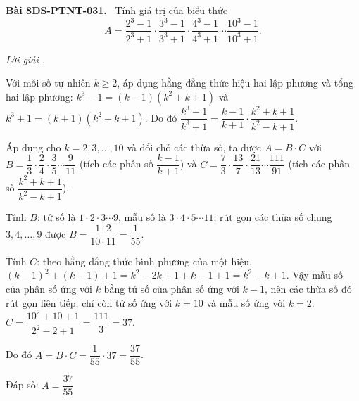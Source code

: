 \documentclass[12pt,a4paper]{article}
\newenvironment{problem}[1][]{\par\medskip\noindent\textbf{Bài #1.}\ }{\par}
\newenvironment{solution}[1][]{\par\noindent\textit{Lời giải #1.}\par}{\par}
\begin{document}
\begin{problem}[8DS-PTNT-031]
Tính giá trị của biểu thức
\[ A = \dfrac{2^3 - 1}{2^3 + 1} \cdot \dfrac{3^3 - 1}{3^3 + 1} \cdot \dfrac{4^3 - 1}{4^3 + 1} \cdots \dfrac{10^3 - 1}{10^3 + 1}. \]

\begin{solution}
Với mỗi số tự nhiên $k \geq 2$, áp dụng hằng đẳng thức hiệu hai lập phương và tổng hai lập phương: $k^3 - 1 = (k - 1)(k^2 + k + 1)$ và $k^3 + 1 = (k + 1)(k^2 - k + 1)$. Do đó $\dfrac{k^3 - 1}{k^3 + 1} = \dfrac{k - 1}{k + 1} \cdot \dfrac{k^2 + k + 1}{k^2 - k + 1}$.

Áp dụng cho $k = 2, 3, \ldots, 10$ và đổi chỗ các thừa số, ta được $A = B \cdot C$ với $B = \dfrac{1}{3} \cdot \dfrac{2}{4} \cdot \dfrac{3}{5} \cdots \dfrac{9}{11}$ (tích các phân số $\dfrac{k - 1}{k + 1}$) và $C = \dfrac{7}{3} \cdot \dfrac{13}{7} \cdot \dfrac{21}{13} \cdots \dfrac{111}{91}$ (tích các phân số $\dfrac{k^2 + k + 1}{k^2 - k + 1}$).

Tính $B$: tử số là $1 \cdot 2 \cdot 3 \cdots 9$, mẫu số là $3 \cdot 4 \cdot 5 \cdots 11$; rút gọn các thừa số chung $3, 4, \ldots, 9$ được $B = \dfrac{1 \cdot 2}{10 \cdot 11} = \dfrac{1}{55}$.

Tính $C$: theo hằng đẳng thức bình phương của một hiệu, $(k - 1)^2 + (k - 1) + 1 = k^2 - 2k + 1 + k - 1 + 1 = k^2 - k + 1$. Vậy mẫu số của phân số ứng với $k$ bằng tử số của phân số ứng với $k - 1$, nên các thừa số đó rút gọn liên tiếp, chỉ còn tử số ứng với $k = 10$ và mẫu số ứng với $k = 2$: $C = \dfrac{10^2 + 10 + 1}{2^2 - 2 + 1} = \dfrac{111}{3} = 37$.

Do đó $A = B \cdot C = \dfrac{1}{55} \cdot 37 = \dfrac{37}{55}$.

Đáp số: $\boxed{A = \dfrac{37}{55}}$
\end{solution}
\end{problem}
\end{document}
